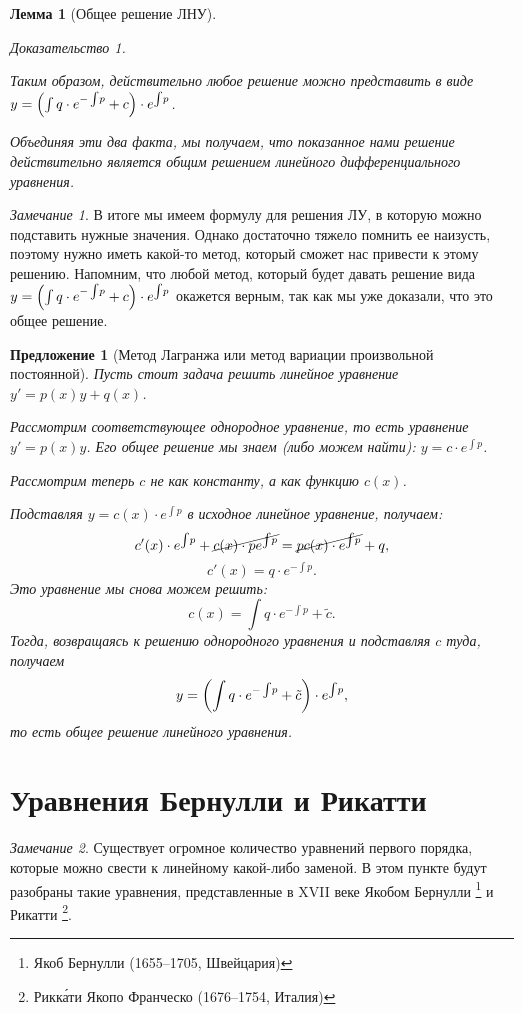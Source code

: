 \documentclass[a5paper, 10pt]{article}
\theoremstyle{definition}
\theoremstyle{plain}
\newtheorem{Lem}{Лемма}
\newtheorem*{Prop}{Предложение}
\theoremstyle{remark}
\newtheorem*{Note}{Замечание}
\newtheorem*{Proof}{Доказательство}
\begin{document}
\begin{Lem}[Общее решение ЛНУ]
\begin{Proof}
\begin{itemize}
				Таким образом, действительно любое решение можно представить в виде $y = \left(\int q \cdot e^{-\int\!p} + c\right) \cdot e^{\int \! p}$.
			\end{itemize}
			Объединяя эти два факта, мы получаем, что показанное нами решение действительно является общим решением линейного дифференциального уравнения.
		\end{Proof}
	\end{Lem}
	
	\begin{Note}
		В итоге мы имеем формулу для решения ЛУ, в которую можно подставить нужные значения. Однако достаточно тяжело помнить ее наизусть, поэтому нужно иметь какой-то метод, который сможет нас привести к этому решению. Напомним, что любой метод, который будет давать решение вида $	y = \left(\int q \cdot e^{-\int\!p} + c\right) \cdot e^{\int \! p}$ окажется верным, так как мы уже доказали, что это общее решение. 
	\end{Note}

	\begin{Prop}[Метод Лагранжа или метод вариации произвольной постоянной]
		Пусть стоит задача решить линейное уравнение $y'=p(x)y+q(x)$.
		
		Рассмотрим соответствующее однородное уравнение, то есть уравнение $y'=p(x)y$. Его общее решение мы знаем (либо можем найти): $y=c\cdot e^{\int\!p}$. 
		
		Рассмотрим теперь $c$ не как константу, а как функцию $c(x)$.
		
		Подставляя $y=c(x) \cdot e^{\int\!p}$ в исходное линейное уравнение, получаем:
		\[
		c'(x) \cdot e^{\int\!p} + \cancel{c(x) \cdot p e^{\int\!p}} = \cancel{p c(x) \cdot e^{\int\!p}} + q,
		\]
		\[
		c'(x) = q\cdot e^{-\int\!p}.
		\]
		Это уравнение мы снова можем решить:
		\[
		c(x) = \int q\cdot e^{-\int\!p} + \tilde{c}.
		\]
		Тогда, возвращаясь к решению однородного уравнения и подставляя $c$ туда, получаем
		\[
		y = \left(\int q\cdot e^{-\int\!p} + \tilde{c}\right)\cdot e^{\int\!p},
		\]
		то есть общее решение линейного уравнения.
	\end{Prop}

	\section[Бернулли и Рикатти]{Уравнения Бернулли и Рикатти}
	\begin{Note}
		Существует огромное количество уравнений первого порядка, которые можно свести к линейному какой-либо заменой. В этом пункте будут разобраны такие уравнения, представленные в XVII веке Якобом Бернулли \footnote{Якоб Бернулли (1655--1705, Швейцария)} и Рикатти \footnote{Рикк\'{а}ти Якопо Франческо (1676--1754, Италия)}.
	\end{Note}
	
\end{document}
